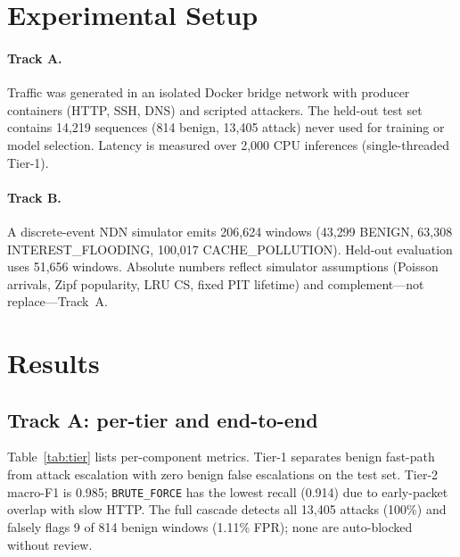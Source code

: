 \documentclass[conference]{IEEEtran}
\begin{document}
\section{Experimental Setup}
\label{sec:setup}

\paragraph{Track A.}
Traffic was generated in an isolated Docker bridge network with producer containers (HTTP, SSH, DNS) and scripted attackers. The held-out test set contains 14{,}219 sequences (814 benign, 13{,}405 attack) never used for training or model selection. Latency is measured over 2{,}000 CPU inferences (single-threaded Tier-1).

\paragraph{Track B.}
A discrete-event NDN simulator emits 206{,}624 windows (43{,}299 BENIGN, 63{,}308 INTEREST\_FLOODING, 100{,}017 CACHE\_POLLUTION). Held-out evaluation uses 51{,}656 windows. Absolute numbers reflect simulator assumptions (Poisson arrivals, Zipf popularity, LRU CS, fixed PIT lifetime) and complement---not replace---Track~A.

\section{Results}
\label{sec:results}

\subsection{Track A: per-tier and end-to-end}
Table~\ref{tab:tier} lists per-component metrics. Tier-1 separates benign fast-path from attack escalation with zero benign false escalations on the test set. Tier-2 macro-F1 is 0.985; \texttt{BRUTE\_FORCE} has the lowest recall (0.914) due to early-packet overlap with slow HTTP. The full cascade detects all 13{,}405 attacks (100\%) and falsely flags 9 of 814 benign windows (1.11\% FPR); none are auto-blocked without review.
\end{document}
